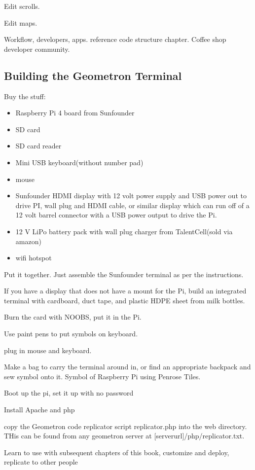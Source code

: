 Edit scrolls.

Edit maps.

Workflow, developers, apps.  reference code structure chapter. Coffee shop developer community.


\subsection{Building the Geometron Terminal}

Buy the stuff:

\begin{itemize}
\item
Raspberry Pi 4 board from Sunfounder
\item
SD card
\item
SD card reader
\item
Mini USB keyboard(without number pad)
\item
mouse
\item
Sunfounder HDMI display with 12 volt power supply and USB power out to drive PI, wall plug and HDMI cable, or similar display which can run off of a 12 volt barrel connector with a USB power output to drive the Pi.
\item
12 V LiPo battery pack with wall plug charger from TalentCell(sold via amazon)
\item
wifi hotspot
\end{itemize}

Put it together.  Just assemble the Sunfounder terminal as per the instructions.  

If you have a display that does not have a mount for the Pi, build an integrated terminal with cardboard, duct tape, and plastic HDPE sheet from milk bottles.

Burn the card with NOOBS, put it in the Pi.

Use paint pens to put symbols on keyboard.

plug in mouse and keyboard.

Make a bag to carry the terminal around in, or find an appropriate backpack and sew symbol onto it.  Symbol of Raspberry Pi using Penrose Tiles.

Boot up the pi, set it up with no password

Install Apache and php

copy the Geometron code replicator script replicator.php into the web directory. THis can be found from any geometron server at [serverurl]/php/replicator.txt.  

Learn to use with subsequent chapters of this book, customize and deploy, replicate to other people


